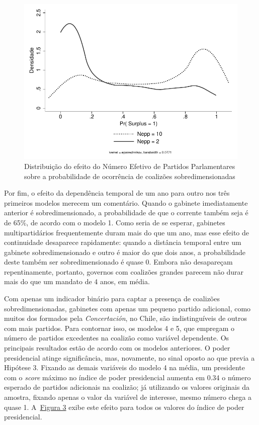 \begin{figure}[htb]
	\label{fig:figura2}
	\caption{Distribuição do efeito do Número Efetivo de Partidos Parlamentares sobre a probabilidade de ocorrência de coalizões sobredimensionadas}
	\begin{center}
	    \includegraphics[scale=1.1]{enp.pdf}
	\end{center}
\end{figure}


Por fim, o efeito da dependência temporal de um ano para outro nos três primeiros modelos merecem um comentário. Quando o gabinete imediatamente anterior é sobredimensionado, a probabilidade de que o corrente também seja é de 65\%, de acordo com o modelo 1. Como seria de se esperar, gabinetes multipartidários frequentemente duram mais do que um ano, mas esse efeito de continuidade desaparece rapidamente: quando a distância temporal entre um gabinete sobredimensionado e outro é maior do que dois anos, a probabilidade deste também ser sobredimensionado é quase 0. Embora não desapareçam repentinamente, portanto, governos com coalizões grandes parecem não durar mais do que um mandato de 4 anos, em média.

Com apenas um indicador binário para captar a presença de coalizões sobredimensionadas, gabinetes com apenas um pequeno partido adicional, como muitos dos formados pela \textit{Concertación}, no Chile, são indistinguíveis de outros com mais partidos. Para contornar isso, os modelos 4 e 5, que empregam o número de partidos excedentes na coalizão como variável dependente. Os principais resultados estão de acordo com os modelos anteriores. O poder presidencial atinge significância, mas, novamente, no sinal oposto ao que previa a Hipótese 3. Fixando as demais variáveis do modelo 4 na média, um presidente com o \textit{score} máximo no índice de poder presidencial aumenta em 0.34 o número esperado de partidos adicionais na coalizão; já utilizando os valores originais da amostra, fixando apenas o valor da variável de interesse, mesmo número chega a quase 1. A~\hyperref[fig:figura3]{Figura 3} exibe este efeito para todos os valores do índice de poder presidencial.

